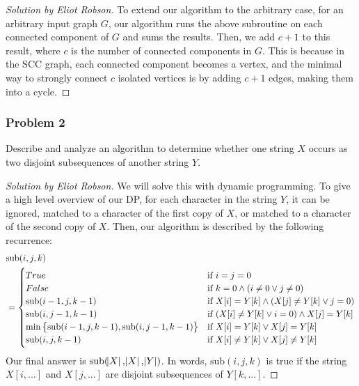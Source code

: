 \documentclass{article}
\newenvironment{solution}[1]{\begin{proof}[Solution by #1]}{\end{proof}}
\begin{document}
\begin{solution}{Eliot Robson}
    To extend our algorithm to the arbitrary case, for an arbitrary input graph \(G\), our algorithm runs the above subroutine on each connected component of \(G\) and sums the results. Then, we add \(c+1\) to this result, where \(c\) is the number of connected components in \(G\). This is because in the SCC graph, each connected component becomes a vertex, and the minimal way to strongly connect \(c\) isolated vertices is by adding \(c+1\) edges, making them into a cycle.
\end{solution}

\subsubsection{Problem 2}
Describe and analyze an algorithm to determine whether one string \(X\) occurs as two disjoint subsequences of another string \(Y\).

\begin{solution}{Eliot Robson}
    We will solve this with dynamic programming. To give a high level overview of our DP, for each character in the string \(Y\), it can be ignored, matched to a character of the first copy of \(X\), or matched to a character of the second copy of \(X\). Then, our algorithm is described by the following recurrence:
    \begin{align*}
        &\text{sub}(i, j, k)\\
        &=%
        \begin{cases}
            True &\text{if } i = j = 0\\
            False &\text{if } k = 0 \wedge (i \neq 0 \vee j \neq 0)\\
            \text{sub} (i-1, j, k-1)
            &\text{if } X[i] = Y[k] \wedge (X[j] \neq Y[k] \vee j = 0)\\
            \text{sub} (i, j-1, k-1)
            &\text{if } (X[i] \neq Y[k] \vee i = 0) \wedge X[j] = Y[k]\\
            \min \cbr{\text{sub}(i-1, j, k-1), \text{sub}(i, j-1, k-1)}
            &\text{if } X[i] = Y[k] \vee X[j] = Y[k]\\
            \text{sub} (i,j, k-1)
            &\text{if } X[i] \neq Y[k] \vee X[j] \neq Y[k]
        \end{cases}
    \end{align*}
    Our final answer is \(\text{sub}(\abs{X}, \abs{X}, \abs{Y})\). In words, \(\text{sub}(i,j,k)\) is true if the string \(X[i, ...]\) and \(X[j, ...]\) are disjoint subsequences of \(Y[k,...]\).
\end{solution}
\end{document}
